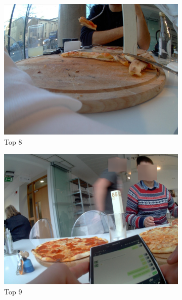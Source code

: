 \begin{figure}[H]
\begin{subfigure}{0.32\textwidth}
        \includegraphics[width=\textwidth]{Sections/7Results/images/run2top8.jpg}\hfill
        \caption{Top 8}
      \end{subfigure}
      \begin{subfigure}{0.32\textwidth}
        \includegraphics[width=\textwidth]{Sections/7Results/images/run2top9.jpg}\hfill
        \caption{Top 9}
      \end{subfigure} \par\medskip
      \begin{subfigure}{0.32\textwidth}

\end{subfigure}
\end{figure}
